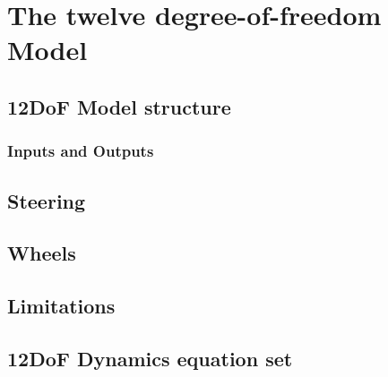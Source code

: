 \chapter{The twelve degree-of-freedom Model}
\label{chap:12dof}
\section{12DoF Model structure}
\label{sec:12dofconcept}
\subsection{Inputs and Outputs}
\section{Steering}
\label{sec:steering}
\section{Wheels}
\label{sec:wheels}
\section{Limitations}
\label{sec:12doflimits}
\section{12DoF Dynamics equation set}
\label{sec:12dofeq}
